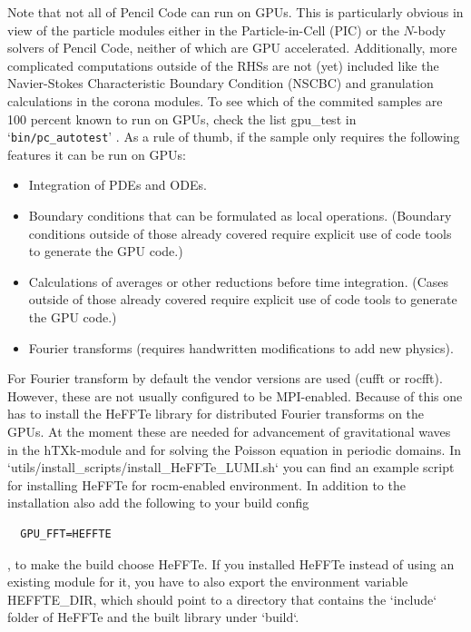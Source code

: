 \documentclass[\mydriver,12pt,twoside,notitlepage,a4paper]{article}
\makeatletter
\newcommand{\file}[2][]{%
  \def\index@{#1}%
  `\texttt{#2}'%
  \ifx\index@\@empty\index[file]{#2@\texttt{#2}}%
  \else\index[file]{#1@\texttt{#1}}%
  \fi%
}
\makeatother
\begin{document}
Note that not all of Pencil Code can run on GPUs. 
This is particularly obvious in view of the particle modules either in the Particle-in-Cell (PIC) or the $N$-body solvers of Pencil Code, neither of which are GPU accelerated.
Additionally, more complicated computations outside of the RHSs are not (yet) included like the Navier-Stokes Characteristic Boundary Condition (NSCBC) and granulation calculations in the corona modules.
To see which of the commited samples are 100 percent known to run on GPUs, check the list gpu\_test in \file{bin/pc_autotest}.
As a rule of thumb, if the sample only requires the following features it can be run on GPUs:
\begin{itemize}
  \item Integration of PDEs and ODEs.
  \item  Boundary conditions that can be formulated
         as local operations. (Boundary conditions outside of those already covered require
         explicit use of code tools to generate the GPU code.)
  \item Calculations of averages or other reductions before time integration.
	(Cases outside of those already covered require explicit use of code tools to generate the GPU code.)
  \item Fourier transforms (requires handwritten modifications to add new physics).
\end{itemize}

For Fourier transform by default the vendor versions are used (cufft or rocfft). However, these are not usually configured to be MPI-enabled. Because of this one has to install the HeFFTe library for
distributed Fourier transforms on the GPUs. At the moment these are needed for advancement of gravitational waves in the hTXk-module and for solving the Poisson equation in periodic domains.
In `utils/install\_scripts/install\_HeFFTe\_LUMI.sh` you can find an example script for installing HeFFTe for rocm-enabled environment.
In addition to the installation also add the following to your build config
\begin{verbatim}
  GPU_FFT=HEFFTE
\end{verbatim}, to make the build choose HeFFTe.
If you installed HeFFTe instead of using an existing module for it, you have to also export the environment variable HEFFTE\_DIR, which should point to a directory that contains the `include` folder of HeFFTe and the built library under `build`.
\end{document}
